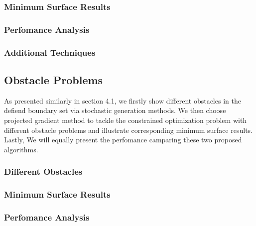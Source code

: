 \subsubsection{Minimum Surface Results}
\subsubsection{Perfomance Analysis}
\subsubsection{Additional Techniques}
\subsection{Obstacle Problems}
As presented similarly in section 4.1, we firstly show different obstacles in the defiend boundary set via stochastic generation methods. We then choose projected gradient method to tackle the constrained optimization problem with different obstacle problems and illustrate corresponding minimum surface results. Lastly, We will equally present the perfomance camparing these two proposed algorithms. 
\subsubsection{Different Obstacles}
\subsubsection{Minimum Surface Results}
\subsubsection{Perfomance Analysis}



